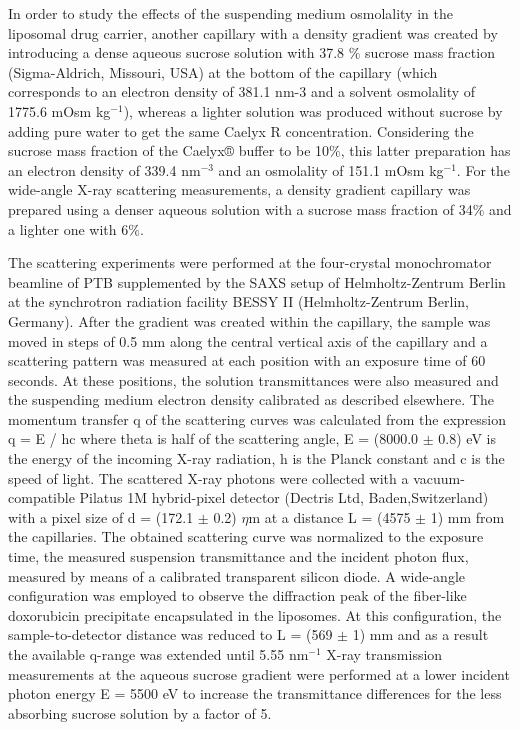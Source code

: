 In order to study the effects of the suspending medium osmolality in the liposomal drug carrier, another capillary with a density gradient was created by introducing a dense aqueous sucrose solution with 37.8 $\%$ sucrose mass fraction (Sigma-Aldrich, Missouri, USA) at the bottom of the capillary (which corresponds to an electron density of 381.1 nm-3 and a solvent osmolality of 1775.6 mOsm kg$^{-1}$), whereas a lighter solution was produced without sucrose by adding pure water to get the same Caelyx R concentration. Considering the sucrose mass fraction of the Caelyx® buffer to be 10$\%$, this latter preparation has an electron density of 339.4 nm$^{-3}$ and an osmolality of 151.1 mOsm kg$^{-1}$. For the wide-angle X-ray scattering measurements, a density gradient capillary was prepared using a denser aqueous solution with a sucrose mass fraction of 34$\%$ and a lighter one with 6$\%$.

The scattering experiments were performed at the four-crystal monochromator beamline of PTB supplemented by the SAXS setup of Helmholtz-Zentrum Berlin at the synchrotron radiation facility BESSY II (Helmholtz-Zentrum Berlin, Germany). After the gradient was created within the capillary, the sample was moved in steps of 0.5 mm along the central vertical axis of the capillary and a scattering pattern was measured at each position with an exposure time of 60 seconds. At these positions, the solution transmittances were also measured and the suspending medium electron density calibrated as described elsewhere. The momentum transfer q of the scattering curves was calculated from the expression q = E / hc where theta is half of the scattering angle, E = (8000.0 $\pm$ 0.8) eV is the energy of the incoming X-ray radiation, h is the Planck constant and c is the speed of light. The scattered X-ray photons were collected with a vacuum-compatible Pilatus 1M hybrid-pixel detector (Dectris Ltd, Baden,Switzerland) with a pixel size of d = (172.1 $\pm$ 0.2) $\eta$m at a distance L = (4575 $\pm$ 1) mm from the capillaries. The obtained scattering curve was normalized to the exposure time, the measured suspension transmittance and the incident photon flux, measured by means of a calibrated transparent silicon diode. A wide-angle configuration was employed to observe the diffraction peak of the fiber-like doxorubicin precipitate encapsulated in the liposomes. At this configuration, the sample-to-detector distance was reduced to L = (569 $\pm$ 1) mm and as a result the available q-range was extended until 5.55 nm$^{-1}$ X-ray transmission measurements at the aqueous sucrose gradient were performed at a lower incident photon energy E = 5500 eV to increase the transmittance differences for the less absorbing sucrose solution by a factor of 5.

